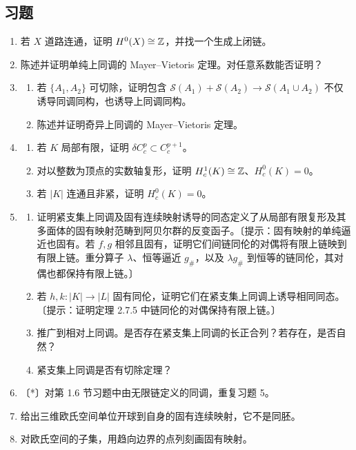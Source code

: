 \subsection*{习题}
\begin{enumerate}
\item 若 $X$ 道路连通，证明 $H^0(X)\cong\mathbb{Z}$，并找一个生成上闭链。
\item 陈述并证明单纯上同调的 Mayer--Vietoris 定理。对任意系数能否证明？
\item \begin{enumerate}[label=(\alph*)]
\item 若 $\{A_1,A_2\}$ 可切除，证明包含 $\mathcal S(A_1)+\mathcal S(A_2)\to\mathcal S(A_1\cup A_2)$ 不仅诱导同调同构，也诱导上同调同构。
\item 陈述并证明奇异上同调的 Mayer--Vietoris 定理。
\end{enumerate}
\item \begin{enumerate}[label=(\alph*)]
\item 若 $K$ 局部有限，证明 $\delta C_c^p\subset C_c^{p+1}$。
\item 对以整数为顶点的实数轴复形，证明 $H_c^1(K)\cong\mathbb{Z}$、$H_c^0(K)=0$。
\item 若 $|K|$ 连通且非紧，证明 $H_c^0(K)=0$。
\end{enumerate}
\item \begin{enumerate}[label=(\alph*)]
\item 证明紧支集上同调及固有连续映射诱导的同态定义了从局部有限复形及其多面体的固有映射范畴到阿贝尔群的反变函子。〔提示：固有映射的单纯逼近也固有。若 $f,g$ 相邻且固有，证明它们间链同伦的对偶将有限上链映到有限上链。重分算子 $\lambda$、恒等逼近 $g_\#$，以及 $\lambda g_\#$ 到恒等的链同伦，其对偶也都保持有限上链。〕
\item 若 $h,k:|K|\to|L|$ 固有同伦，证明它们在紧支集上同调上诱导相同同态。〔提示：证明定理 2.7.5 中链同伦的对偶保持有限上链。〕
\item 推广到相对上同调。是否存在紧支集上同调的长正合列？若存在，是否自然？
\item 紧支集上同调是否有切除定理？
\end{enumerate}
\item 〔*〕对第 1.6 节习题中由无限链定义的同调，重复习题 5。
\item 给出三维欧氏空间单位开球到自身的固有连续映射，它不是同胚。
\item 对欧氏空间的子集，用趋向边界的点列刻画固有映射。
\end{enumerate}

